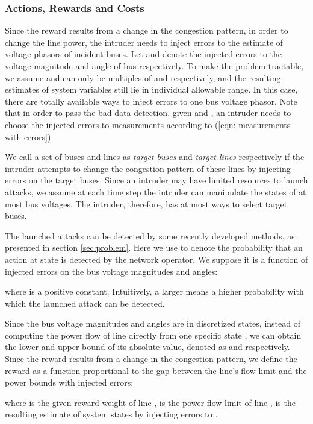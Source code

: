 \documentclass[conference,letterpaper,10pt]{IEEEtran}
\begin{document}
\subsubsection{Actions, Rewards and Costs}
Since the reward results from a change in the congestion pattern, in order to change the line power, the intruder needs to inject errors to the estimate of voltage phasors of incident buses. Let  and  denote the injected errors to the voltage magnitude and angle of bus  respectively. To make the problem tractable, we assume  and  can only be multiples of  and   respectively, and the resulting estimates of system variables still lie in individual allowable range. In this case, there are totally  available ways to inject errors to one bus voltage phasor. Note that in order to pass the bad data detection, given  and , an intruder needs to choose the injected errors  to measurements according to (\ref{eqn: measurements with errors}).

 We call a set of  buses and lines as \textit{target buses} and \textit{target lines} respectively if the intruder attempts to change the congestion pattern of these lines by injecting errors on the target buses. Since an intruder may have limited resources to launch attacks, we assume at each time step the intruder can manipulate the states of at most  bus voltages. The intruder, therefore, has at most  ways to select target buses.



 


The launched attacks can be detected by some recently developed methods, as presented in section \ref{sec:problem}. Here we use  to denote the probability that an action  at state  is detected by the network operator. We suppose it is a function of injected errors on the bus voltage magnitudes and angles:

where  is a positive constant. Intuitively, a larger  means a higher probability with which the launched attack can be detected.

Since the bus voltage magnitudes and angles are in discretized states, instead of computing the power flow of line  directly from one specific state , we can obtain the lower and upper bound of its absolute value, denoted as  and  respectively.
Since the reward results from a change in the congestion pattern, we define the reward as a function proportional to the gap between the line's flow limit and the power bounds with injected errors:

where  is the given reward weight of line ,  is the power flow limit of line ,  is the resulting estimate of system states by injecting errors  to . 
\end{document}
